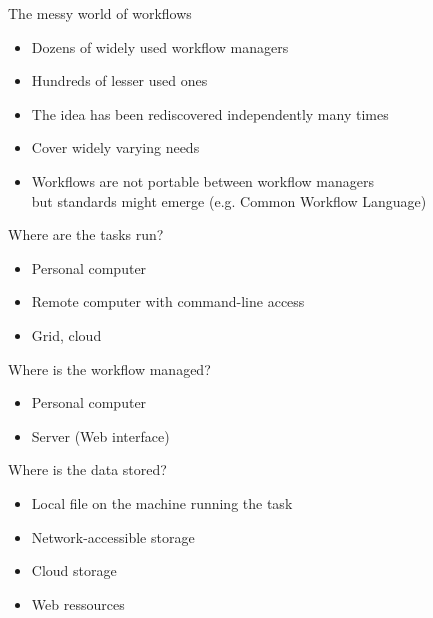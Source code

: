 \documentclass[aspectratio=169]{beamer}
\begin{document}
\begin{frame}{The messy world of workflows}

  \begin{itemize}
  \item Dozens of widely used workflow managers
  \item Hundreds of lesser used ones
  \item The idea has been rediscovered independently many times
  \item Cover widely varying needs
  \item Workflows are not portable between workflow managers\\
        but standards might emerge (e.g. Common Workflow Language)
  \end{itemize}

\end{frame}

\begin{frame}{Where are the tasks run?}

  \begin{itemize}
  \item Personal computer
  \item Remote computer with command-line access
  \item Grid, cloud
  \end{itemize}

\end{frame}

\begin{frame}{Where is the workflow managed?}

  \begin{itemize}
  \item Personal computer
  \item Server (Web interface)
  \end{itemize}

\end{frame}

\begin{frame}{Where is the data stored?}

  \begin{itemize}
  \item Local file on the machine running the task
  \item Network-accessible storage
  \item Cloud storage
  \item Web ressources
  \end{itemize}

\end{frame}
\end{document}
